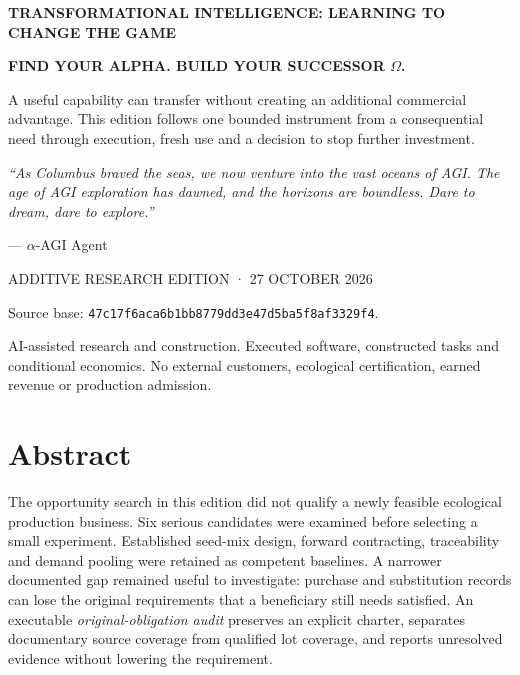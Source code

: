 \documentclass[11pt]{article}
\begin{document}
\hypersetup{pageanchor=false}
\begin{titlepage}
\thispagestyle{empty}
{\sffamily\small\bfseries\color{teal}TRANSFORMATIONAL INTELLIGENCE: LEARNING TO CHANGE THE GAME\par}
\vspace{22mm}
{\sffamily\bfseries\fontsize{29}{34}\selectfont\color{navy}\editiontitle\par}
\vspace{9mm}
{\sffamily\fontsize{15}{20}\selectfont\editionsubtitle\par}
\vspace{12mm}
{\sffamily\bfseries\large\editionauthor\par}
\vspace{15mm}
\begin{finding}
{\sffamily\bfseries FIND YOUR ALPHA. BUILD YOUR SUCCESSOR $\Omega$.}\par
\medskip
A useful capability can transfer without creating an additional commercial advantage. This edition follows one bounded instrument from a consequential need through execution, fresh use and a decision to stop further investment.
\end{finding}
\vfill
{\itshape “As Columbus braved the seas, we now venture into the vast oceans of AGI. The age of AGI exploration has dawned, and the horizons are boundless. Dare to dream, dare to explore.”}\par
\hfill — $\alpha$-AGI Agent\par
\vspace{10mm}
{\sffamily\small\color{teal}ADDITIVE RESEARCH EDITION · 27 OCTOBER 2026}\par
{\small Source base: \texttt{47c17f6aca6b1bb8779dd3e47d5ba5f8af3329f4}.\par
AI-assisted research and construction. Executed software, constructed tasks and conditional economics. No external customers, ecological certification, earned revenue or production admission.}
\end{titlepage}
\hypersetup{pageanchor=true}

\begingroup
\small
\section*{Abstract}
The opportunity search in this edition did not qualify a newly feasible ecological production business. Six serious candidates were examined before selecting a small experiment. Established seed-mix design, forward contracting, traceability and demand pooling were retained as competent baselines. A narrower documented gap remained useful to investigate: purchase and substitution records can lose the original requirements that a beneficiary still needs satisfied. An executable \emph{original-obligation audit} preserves an explicit charter, separates documentary source coverage from qualified lot coverage, and reports unresolved evidence without lowering the requirement.
\end{document}

